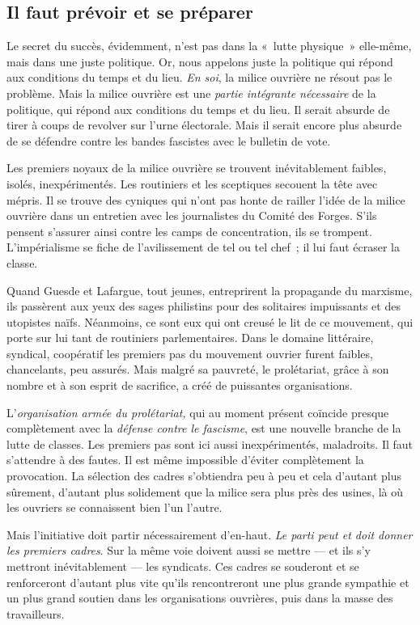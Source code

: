 \documentclass[french,twoside]{book} %
\begin{document}
 \subsection[{Il faut prévoir et se préparer}]{Il faut prévoir et se préparer}
\noindent Le secret du succès, évidemment, n’est pas dans la « lutte physique » elle-même, mais dans une juste politique. Or, nous appelons juste la politique qui répond aux conditions du temps et du lieu. \emph{En soi}, la milice ouvrière ne résout pas le problème. Mais la milice ouvrière est une \emph{partie intégrante nécessaire} de la politique, qui répond aux conditions du temps et du lieu. Il serait absurde de tirer à coups de revolver sur l’urne électorale. Mais il serait encore plus absurde de se défendre contre les bandes fascistes avec le bulletin de vote.\par
Les premiers noyaux de la milice ouvrière se trouvent inévitablement faibles, isolés, inexpérimentés. Les routiniers et les sceptiques secouent la tête avec mépris. Il se trouve des cyniques qui n’ont pas honte de railler l’idée de la milice ouvrière dans un entretien avec les journalistes du Comité des Forges. S’ils pensent s’assurer ainsi contre les camps de concentration, ils se trompent. L’impérialisme se fiche de l’avilissement de tel ou tel chef ; il lui faut écraser la classe.\par
Quand Guesde et Lafargue, tout jeunes, entreprirent la propagande du marxisme, ils passèrent aux yeux des sages philistins pour des solitaires impuissants et des utopistes naïfs. Néanmoins, ce sont eux qui ont creusé le lit de ce mouvement, qui porte sur lui tant de routiniers parlementaires. Dans le domaine littéraire, syndical, coopératif les premiers pas du mouvement ouvrier furent faibles, chancelants, peu assurés. Mais malgré sa pauvreté, le prolétariat, grâce à son nombre et à son esprit de sacrifice, a créé de puissantes organisations.\par
L’\emph{organisation armée du prolétariat,} qui au moment présent coïncide presque complètement avec la \emph{défense contre le fascisme}, est une nouvelle branche de la lutte de classes. Les premiers pas sont ici aussi inexpérimentés,  maladroits. Il faut s’attendre à des fautes. Il est même impossible d’éviter complètement la provocation. La sélection des cadres s’obtiendra peu à peu et cela d’autant plus sûrement, d’autant plus solidement que la milice sera plus près des usines, là où les ouvriers se connaissent bien l’un l’autre.\par
Mais l’initiative doit partir nécessairement d’en-haut. \emph{Le parti peut et doit donner les premiers cadres}. Sur la même voie doivent aussi se mettre — et ils s’y mettront inévitablement — les syndicats. Ces cadres se souderont et se renforceront d’autant plus vite qu’ils rencontreront une plus grande sympathie et un plus grand soutien dans les organisations ouvrières, puis dans la masse des travailleurs.\par
\end{document}

